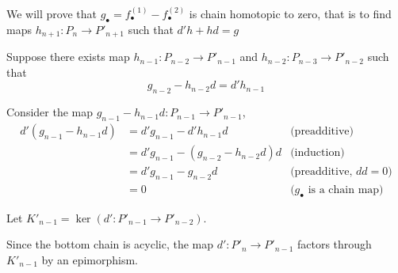 \documentclass{article}
\begin{document}
\begin{longproof}
\begin{enumerate}
        We will prove that $g_\bullet = f^{(1)}_\bullet - f^{(2)}_\bullet$ is chain homotopic to zero, that is to find maps $h_{n+1}: P_n \to P'_{n+1}$ such that $d'h + hd = g$

        \begin{center}
        \end{center}

        Suppose there exists map $h_{n-1}: P_{n-2} \to P'_{n-1}$ and $h_{n-2}: P_{n-3} \to P'_{n-2}$ such that
        $$
            g_{n-2} - h_{n-2} d = d' h_{n-1}
        $$

        \begin{center}
        \end{center}

        Consider the map $g_{n-1} - h_{n-1} d: P_{n-1} \to P'_{n-1}$,
        \begin{align*}
            d'(g_{n-1} - h_{n-1} d) 
            &= d' g_{n-1} - d' h_{n-1} d &\text{(preadditive)}\\
            &= d' g_{n-1} - (g_{n-2} - h_{n-2} d) d &\text{(induction)}\\
            &= d' g_{n-1} - g_{n-2} d &\text{(preadditive, $dd=0$)}\\
            &= 0 &\text{($g_\bullet$ is a chain map)}
        \end{align*}

        Let $K'_{n-1} = \ker(d': P'_{n-1} \to P'_{n-2})$.

        Since the bottom chain is acyclic, the map $d': P'_n \to P'_{n-1}$ factors through $K'_{n-1}$ by an epimorphism.


\end{enumerate}
\end{longproof}
\end{document}

